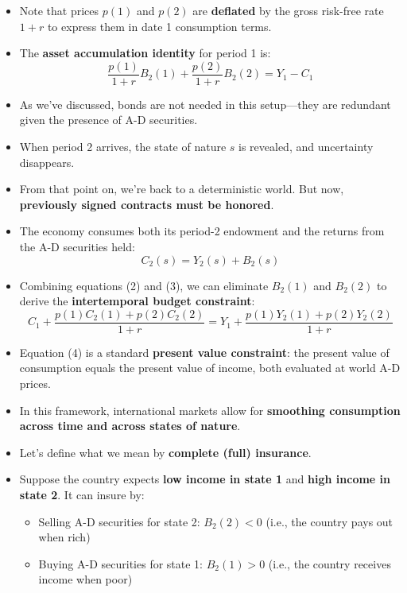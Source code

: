 \documentclass[12pt]{article}
\begin{document}
\begin{itemize}
\item Note that prices $p(1)$ and $p(2)$ are \textbf{deflated} by the gross risk-free rate $1 + r$ to express them in date 1 consumption terms.

\item The \textbf{asset accumulation identity} for period 1 is:
\[
\frac{p(1)}{1 + r} B_2(1) + \frac{p(2)}{1 + r} B_2(2) = Y_1 - C_1 \tag{2}
\]

\item As we’ve discussed, bonds are not needed in this setup—they are redundant given the presence of A-D securities.

\item When period 2 arrives, the state of nature $s$ is revealed, and uncertainty disappears.

\item From that point on, we’re back to a deterministic world. But now, \textbf{previously signed contracts must be honored}.

\item The economy consumes both its period-2 endowment and the returns from the A-D securities held:
\[
C_2(s) = Y_2(s) + B_2(s) \tag{3}
\]

\item Combining equations (2) and (3), we can eliminate $B_2(1)$ and $B_2(2)$ to derive the \textbf{intertemporal budget constraint}:
\[
C_1 + \frac{p(1)C_2(1) + p(2)C_2(2)}{1 + r} = Y_1 + \frac{p(1)Y_2(1) + p(2)Y_2(2)}{1 + r} \tag{4}
\]

\item Equation (4) is a standard \textbf{present value constraint}: the present value of consumption equals the present value of income, both evaluated at world A-D prices.

\item In this framework, international markets allow for \textbf{smoothing consumption across time and across states of nature}.

\item Let’s define what we mean by \textbf{complete (full) insurance}.

\item Suppose the country expects \textbf{low income in state 1} and \textbf{high income in state 2}. It can insure by:
  \begin{itemize}
    \item Selling A-D securities for state 2: $B_2(2) < 0$ (i.e., the country pays out when rich)
    \item Buying A-D securities for state 1: $B_2(1) > 0$ (i.e., the country receives income when poor)
  \end{itemize}


\end{itemize}
\end{document}
